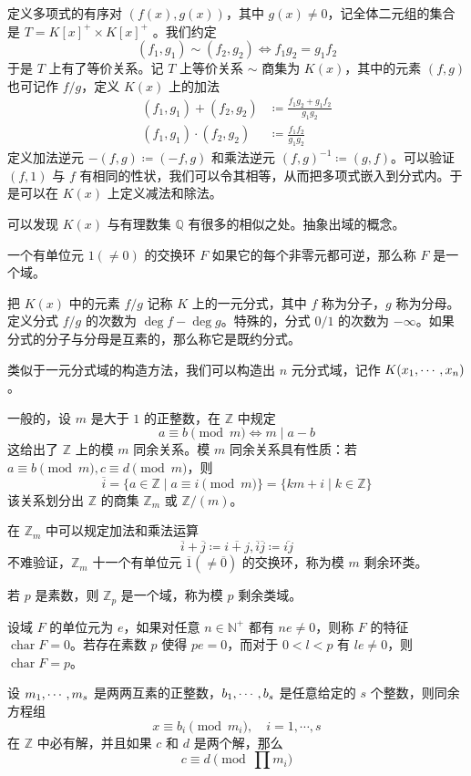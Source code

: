 定义多项式的有序对 $(f(x), g(x))$，其中 $g(x) \ne 0$，记全体二元组的集合是 $T = K[x]^+ \times K[x]^+$ 。我们约定
\[ (f_1,g_1) \sim (f_2,g_2) \Leftrightarrow f_1g_2 = g_1f_2 \]
于是 $T$ 上有了等价关系。记 $T$ 上等价关系 $\sim$ 商集为 $K(x)$，其中的元素 $(f,g)$ 也可记作 $f/g$，定义 $K(x)$ 上的加法
\[
	\begin{aligned}
		(f_1,g_1) + (f_2,g_2)     & \coloneqq \frac{f_1g_2+g_1f_2}{g_1g_2} \\
		(f_1,g_1) \cdot (f_2,g_2) & \coloneqq \frac{f_1f_2}{g_1g_2}
	\end{aligned}
\]
定义加法逆元 $-(f,g) \coloneqq (-f,g)$ 和乘法逆元 $(f,g)^{-1} \coloneqq (g,f)$。可以验证 $(f,1)$ 与 $f$ 有相同的性状，我们可以令其相等，从而把多项式嵌入到分式内。于是可以在 $K(x)$ 上定义减法和除法。

可以发现 $K(x)$ 与有理数集 $\mathbb{Q}$ 有很多的相似之处。抽象出域的概念。

\begin{definition}[域]
	一个有单位元 $1 (\ne 0)$ 的交换环 $F$ 如果它的每个非零元都可逆，那么称 $F$ 是一个域。
\end{definition}

把 $K(x)$ 中的元素 $f/g$ 记称 $K$ 上的一元分式，其中 $f$ 称为分子，$g$ 称为分母。定义分式 $f/g$ 的次数为 $\deg f - \deg g$。特殊的，分式 $0/1$ 的次数为 $-\infty$。如果分式的分子与分母是互素的，那么称它是既约分式。

类似于一元分式域的构造方法，我们可以构造出 $n$ 元分式域，记作 $K(x_1,\cdots,x_n)$。

一般的，设 $m$ 是大于 $1$ 的正整数，在 $\mathbb{Z}$ 中规定
\[ a \equiv b \pmod m \Leftrightarrow m \mid a - b\]
这给出了 $\mathbb{Z}$ 上的模 $m$ 同余关系。模 $m$ 同余关系具有性质：若 $a \equiv b \pmod m, c \equiv d \pmod m$，则
\[ \overline{i} = \{ a \in \mathbb{Z} \mid a \equiv i \pmod m \} = \{ km + i \mid k \in \mathbb{Z} \} \]
该关系划分出 $\mathbb{Z}$ 的商集 $\mathbb{Z}_m$ 或 $\mathbb{Z}/(m)$。

在 $\mathbb{Z}_m$ 中可以规定加法和乘法运算
\[ \overline{i} + \overline{j} \coloneqq \overline{i+j}, \overline{i} \overline{j} \coloneqq \overline{ij} \]
不难验证，$\mathbb{Z}_m$ 十一个有单位元 $\overline{1} (\ne \overline{0})$ 的交换环，称为模 $m$ 剩余环类。

若 $p$ 是素数，则 $\mathbb{Z}_p$ 是一个域，称为模 $p$ 剩余类域。

\begin{definition}
	设域 $F$ 的单位元为 $e$，如果对任意 $n \in \mathbb{N}^+$ 都有 $ne \ne 0$，则称 $F$ 的特征 $\operatorname{char} F = 0$。若存在素数 $p$ 使得 $pe=0$，而对于 $0 < l < p$ 有 $le \ne 0$，则 $\operatorname{char} F = p$。
\end{definition}

\begin{theorem}[中国剩余定理]
	设 $m_1,\cdots,m_s$ 是两两互素的正整数，$b_1,\cdots,b_s$ 是任意给定的 $s$ 个整数，则同余方程组
	\[ x \equiv b_i \pmod {m_i}, \quad i = 1,\cdots,s \]
	在 $\mathbb{Z}$ 中必有解，并且如果 $c$ 和 $d$ 是两个解，那么
	\[ c \equiv d \pmod {\prod m_i} \]
\end{theorem}


